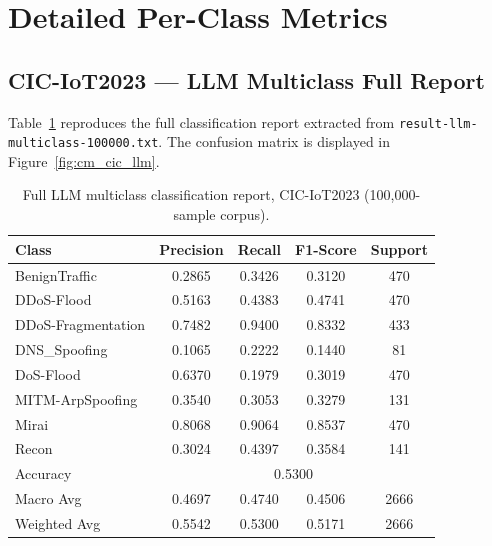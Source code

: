 
\appendix

\section{Detailed Per-Class Metrics}\label{app:detailed}

\subsection{CIC-IoT2023 — LLM Multiclass Full Report}

Table~\ref{tab:app_cic_llm_full} reproduces the full classification report
extracted from \texttt{result-llm-multiclass-100000.txt}. The confusion matrix
is displayed in Figure~\ref{fig:cm_cic_llm}.

\begin{table}[htbp]
\centering
\caption{Full LLM multiclass classification report, CIC-IoT2023
  (100{,}000-sample corpus).}
\label{tab:app_cic_llm_full}
\begin{tabular}{lcccc}
\toprule
\textbf{Class} & \textbf{Precision} & \textbf{Recall} & \textbf{F1-Score} & \textbf{Support} \\
\midrule
BenignTraffic      & 0.2865 & 0.3426 & 0.3120 & 470 \\
DDoS-Flood         & 0.5163 & 0.4383 & 0.4741 & 470 \\
DDoS-Fragmentation & 0.7482 & 0.9400 & 0.8332 & 433 \\
DNS\_Spoofing      & 0.1065 & 0.2222 & 0.1440 &  81 \\
DoS-Flood          & 0.6370 & 0.1979 & 0.3019 & 470 \\
MITM-ArpSpoofing   & 0.3540 & 0.3053 & 0.3279 & 131 \\
Mirai              & 0.8068 & 0.9064 & 0.8537 & 470 \\
Recon              & 0.3024 & 0.4397 & 0.3584 & 141 \\
\midrule
Accuracy           & \multicolumn{4}{c}{0.5300} \\
Macro Avg          & 0.4697 & 0.4740 & 0.4506 & 2666 \\
Weighted Avg       & 0.5542 & 0.5300 & 0.5171 & 2666 \\
\bottomrule
\end{tabular}
\end{table}

